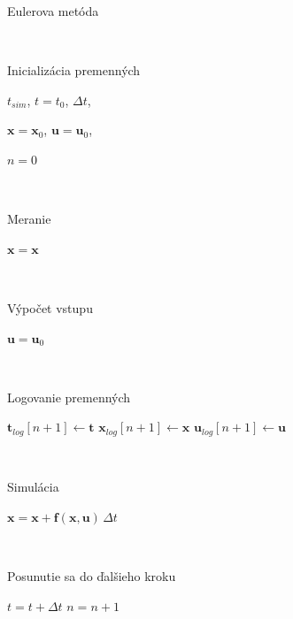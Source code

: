 \documentclass[a4paper, 10pt, ]{article}
\newcommand{\bm}[1]{\mathbf{#1}}
\theoremstyle{definition}
\begin{document}
\begin{algorithm}[H]
    \caption{Eulerova metóda}
    \label{Algorithm:Euler}
    \begin{algorithmic}[1]
        \Statex \

        \noindent Inicializácia premenných
        
        \State $t_{sim}$, \quad
        $t = t_0$, \quad
        $\Delta t$, \quad

        \State $\bm{x} = \bm{x}_0$, \quad
        $\bm{u} = \bm{u}_0$, \quad
        
        \State $n = 0$

        \item[]

            \Statex \
            
            \noindent Meranie

            \State $\bm{x} = \bm{x}$
            
            \Statex \
            
            \noindent Výpočet vstupu
            
            \State $\bm{u} = \bm{u}_0$
            
            \Statex \
            
            \noindent Logovanie premenných

            \State $\bm{t}_{log}[n + 1] \leftarrow \bm{t}$
            \State $\bm{x}_{log}[n + 1] \leftarrow \bm{x}$
            \State $\bm{u}_{log}[n + 1] \leftarrow \bm{u}$
            
            \Statex \
            
            \noindent Simulácia
            
            \State $\bm{x} = \bm{x} + \bm{f}(\bm{x}, \bm{u}) \, \Delta t$
            
            \Statex \
            
            \noindent Posunutie sa do ďalšieho kroku

            \State $t = t + \Delta t$
            \State $n = n + 1$
        \EndWhile


    \end{algorithmic}
\end{algorithm}
\end{document}
